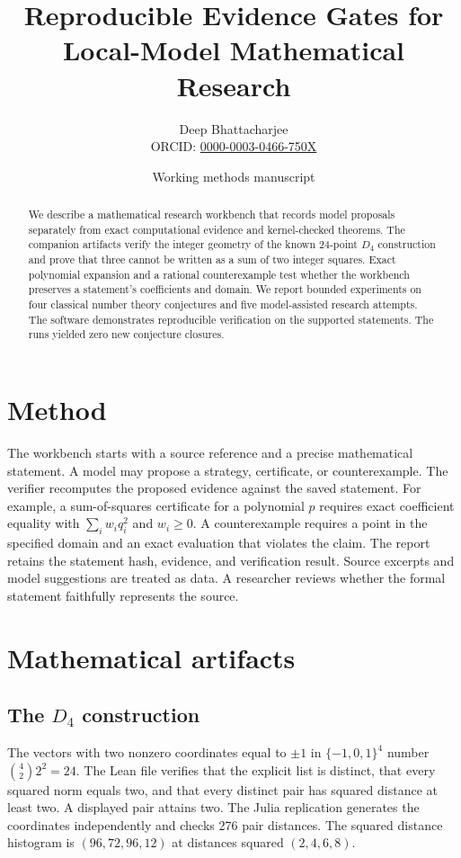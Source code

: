 \documentclass[11pt]{article}
\title{Reproducible Evidence Gates for Local-Model Mathematical Research}
\author{Deep Bhattacharjee\\\small ORCID: \href{https://orcid.org/0000-0003-0466-750X}{0000-0003-0466-750X}}
\date{Working methods manuscript}
\begin{document}
\maketitle
\begin{abstract}
We describe a mathematical research workbench that records model proposals separately from exact computational evidence and kernel-checked theorems. The companion artifacts verify the integer geometry of the known 24-point $D_4$ construction and prove that three cannot be written as a sum of two integer squares. Exact polynomial expansion and a rational counterexample test whether the workbench preserves a statement's coefficients and domain. We report bounded experiments on four classical number theory conjectures and five model-assisted research attempts. The software demonstrates reproducible verification on the supported statements. The runs yielded zero new conjecture closures.
\end{abstract}

\section{Method}
The workbench starts with a source reference and a precise mathematical statement. A model may propose a strategy, certificate, or counterexample. The verifier recomputes the proposed evidence against the saved statement. For example, a sum-of-squares certificate for a polynomial $p$ requires exact coefficient equality with $\sum_i w_i q_i^2$ and $w_i\geq 0$. A counterexample requires a point in the specified domain and an exact evaluation that violates the claim. The report retains the statement hash, evidence, and verification result. Source excerpts and model suggestions are treated as data. A researcher reviews whether the formal statement faithfully represents the source.

\section{Mathematical artifacts}
\subsection{The $D_4$ construction}
The vectors with two nonzero coordinates equal to $\pm1$ in $\{-1,0,1\}^4$ number $\binom42 2^2=24$. The Lean file verifies that the explicit list is distinct, that every squared norm equals two, and that every distinct pair has squared distance at least two. A displayed pair attains two. The Julia replication generates the coordinates independently and checks 276 pair distances. The squared distance histogram is $(96,72,96,12)$ at distances squared $(2,4,6,8)$.
\end{document}
